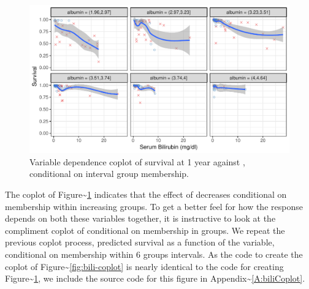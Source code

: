 \documentclass[article]{jss}
\begin{document}
\begin{Schunk}
\begin{figure}[!htb]

{\centering \includegraphics{fig-rfs/rfs-albumin-coplot-1} 

}

\caption[Variable dependence coplot of survival at 1 year against , conditional on  interval group membership]{Variable dependence coplot of survival at 1 year against , conditional on  interval group membership.}\label{fig:albumin-coplot}
\end{figure}
\end{Schunk}

The  coplot of
Figure\textasciitilde{}\ref{fig:albumin-coplot} indicates that the
effect of  decreases conditional on membership within
increasing  groups. To get a better feel for how the
response depends on both these variables together, it is instructive to
look at the compliment coplot of  conditional on
membership in  groups. We repeat the previous coplot process,
predicted survival as a function of the  variable,
conditional on membership within 6 groups  intervals. As the
code to create the coplot of
Figure\textasciitilde{}\ref{fig:bili-coplot} is nearly identical to the
code for creating Figure\textasciitilde{}\ref{fig:albumin-coplot}, we
include the source code for this figure in
Appendix\textasciitilde{}\ref{A:biliCoplot}.
\end{document}
